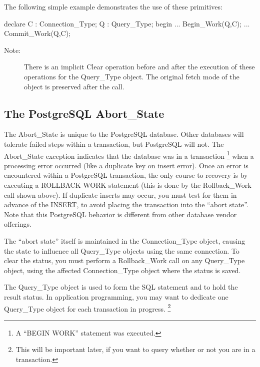\documentclass[english,letterpaper]{book}
\begin{document}
The following simple example demonstrates the use of these primitives:

\begin{Example}
declare
   C :   Connection_Type;
   Q :   Query_Type;
begin
   ...
   Begin_Work(Q,C);
   ...
   Commit_Work(Q,C);
\end{Example}

\begin{description}
   \item [Note:] There is an implicit Clear operation before and after the
      execution of these operations for the Query\_Type object. The original
      fetch mode of the object is preserved after the call. 
\end{description}

\subsection{The PostgreSQL Abort\_State}

The Abort\_State is unique to the PostgreSQL database. Other databases
will tolerate failed steps within a transaction, but PostgreSQL will not.
The Abort\_State \label{Abort_State exception} exception indicates that the database
was in a transaction%
\footnote{A {}``BEGIN WORK'' statement was executed.%
} when a processing error occurred (like a duplicate key on insert
error). Once an error is encountered within a PostgreSQL transaction,
the only course to recovery is by executing a ROLLBACK WORK statement
(this is done by the Rollback\_Work call shown above). If duplicate
inserts may occur, you must test for them in advance of the INSERT,
to avoid placing the transaction into the ``abort state''. Note
that this PostgreSQL behavior is different from other database vendor
offerings.

The ``abort state'' itself is maintained in the Connection\_Type
object, causing the state to influence all Query\_Type objects using
the same connection. To clear the status, you must perform a Rollback\_Work
call on any Query\_Type object, using the affected Connection\_Type
object where the status is saved.

The Query\_Type object is used to form the SQL statement and to hold
the result status. In application programming, you may want to dedicate
one Query\_Type object for each transaction in progress.%
\footnote{This will be important later, if you want to query whether or not
you are in a transaction.%
}
\end{document}
